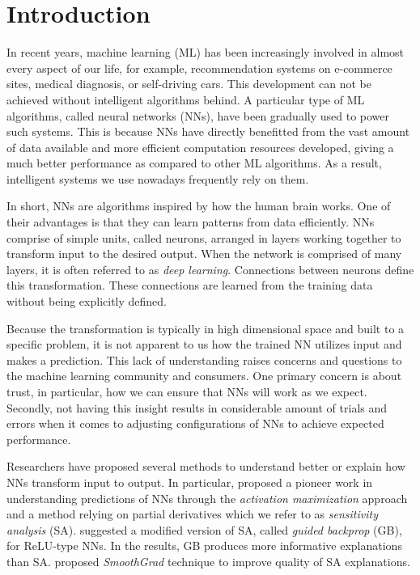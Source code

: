 \chapter{Introduction}
\label{cha:chapter1}
In recent years, machine learning (ML) has been increasingly involved in almost every aspect of our life, for example, recommendation systems on e-commerce sites, medical diagnosis, or self-driving cars. This development can not be achieved without intelligent algorithms behind. A particular type of ML algorithms, called neural networks (NNs), have been gradually used to power such systems.  This is because NNs have directly benefitted from the vast amount of data available and more efficient computation resources developed, giving a much better performance as compared to other ML algorithms. As a result, intelligent systems we use nowadays frequently rely on them.

In short, NNs are algorithms inspired by how the human brain works. One of their advantages is that they can learn patterns from data efficiently. NNs comprise of simple units, called neurons, arranged in layers working together to transform input to the desired output. When the network is comprised of many layers, it is often referred to as \textit{deep learning}. Connections between neurons define this transformation. These connections are learned from the training data without being explicitly defined. 

Because the transformation is typically in high dimensional space and built to a specific problem, it is not apparent to us how the trained NN utilizes input and makes a prediction.  This lack of understanding raises concerns and questions to the machine learning community and consumers. One primary concern is about trust, in particular, how we can ensure that NNs will work as we expect. Secondly, not having this insight results in considerable amount of trials and errors when it comes to adjusting configurations of NNs to achieve expected performance.

Researchers have proposed several methods to understand better or explain how NNs transform input to output. In particular, \citet{SimonyanDeepConvolutionalNetworks2013}  proposed a pioneer work in understanding predictions of NNs through the \textit{activation maximization} approach and a method relying on partial derivatives which we refer to as \textit{sensitivity analysis} (SA). \citet{SpringenbergStrivingSimplicityAll2015a} suggested a modified version of SA, called \textit{guided backprop} (GB), for ReLU-type NNs. In the results, GB produces more informative explanations than SA. \citet{SmilkovSmoothGradremovingnoise2017}  proposed \textit{SmoothGrad} technique to improve quality of SA explanations. 

